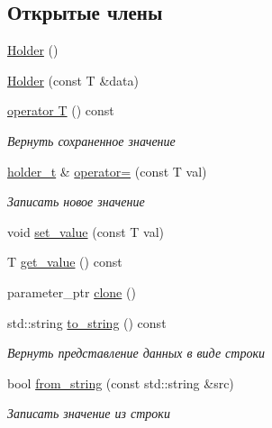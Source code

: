 \subsection*{Открытые члены}
\begin{DoxyCompactItemize}
\item 
\hyperlink{classLIBKMS__namespace_1_1Holder_aaf783d1d73c737a24a8c3d7908e5fb38}{Holder} ()
\item 
\hyperlink{classLIBKMS__namespace_1_1Holder_a072572ebd10dfab076746505589e1524}{Holder} (const T \&data)
\item 
\hyperlink{classLIBKMS__namespace_1_1Holder_ae083c92525080cda7e07f0613219bf50}{operator T} () const 
\begin{DoxyCompactList}\small\item\em Вернуть сохраненное значение \end{DoxyCompactList}\item 
\hyperlink{classLIBKMS__namespace_1_1Holder}{holder\-\_\-t} \& \hyperlink{classLIBKMS__namespace_1_1Holder_a731cef724723c5b2c7b8e54eb7adf162}{operator=} (const T val)
\begin{DoxyCompactList}\small\item\em Записать новое значение \end{DoxyCompactList}\item 
void \hyperlink{classLIBKMS__namespace_1_1Holder_a8ea748f417acec33c92a0879168977f1}{set\-\_\-value} (const T val)
\item 
T \hyperlink{classLIBKMS__namespace_1_1Holder_ad2e6c1867dc854db40a960623f79965d}{get\-\_\-value} () const 
\item 
parameter\-\_\-ptr \hyperlink{classLIBKMS__namespace_1_1Holder_aff9b8117c9662d48700365dac518a973}{clone} ()
\item 
std\-::string \hyperlink{classLIBKMS__namespace_1_1Holder_a4a52e97abc2329b4de3188c8ee2437b7}{to\-\_\-string} () const 
\begin{DoxyCompactList}\small\item\em Вернуть представление данных в виде строки \end{DoxyCompactList}\item 
bool \hyperlink{classLIBKMS__namespace_1_1Holder_aadb0bc39195f64c5fdd1eebda4274175}{from\-\_\-string} (const std\-::string \&src)
\begin{DoxyCompactList}\small\item\em Записать значение из строки \end{DoxyCompactList}\item 

\end{DoxyCompactItemize}
